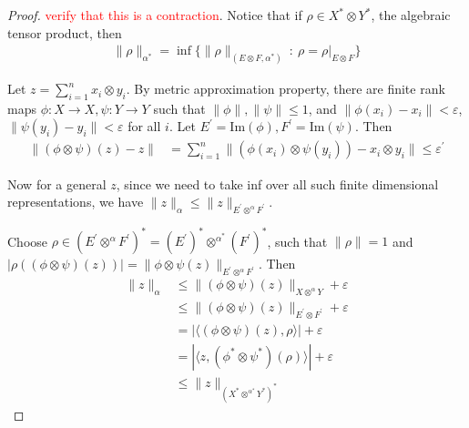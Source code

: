\begin{proof}
  \textcolor{red}{verify that this is a contraction}. Notice that if
  $\rho \in X^* \otimes Y^*$, the algebraic tensor product, then
  \begin{align*}
    \|\rho\|_{\alpha^*} = \inf \{ \|\rho\|_{(E \otimes F, \alpha^*)}
    \ : \   \rho = \rho|_{E \otimes F} \}
  \end{align*}


  Let $z = \sum_{i = 1}^{n} x_i \otimes y_i$. By metric
  approximation property, there are finite rank maps $\phi: X \to X,
  \psi: Y \to Y$ such that $\|\phi\|, \|\psi\| \le 1$, and $\|\phi(x_i)
  - x_i\| < \varepsilon$, $ \|\psi(y_i) - y_i\|< \varepsilon$ for all
  $i$. Let $E^\prime = \textrm{Im}(\phi), F^\prime = \textrm{Im}(\psi)$. Then
  \begin{align*}
    \|(\phi \otimes \psi)(z) - z\| &= \sum_{i = 1}^{n}\|(\phi(x_i)
    \otimes \psi(y_i)) -  x_i \otimes y_i\| \le \varepsilon^\prime
  \end{align*}

  Now for a general $z$, since we need to take inf over all such
  finite dimensional representations, we have $\|z\|_\alpha \le
  \|z\|_{E^\prime \otimes^{\alpha} F^\prime}$.

  Choose $\rho \in (E^\prime \otimes^\alpha F^\prime)^* =
  (E^\prime)^* \otimes^{\alpha^*} (F^\prime)^*$, such that $\|\rho\|
  = 1$ and $|\rho((\phi \otimes \psi)(z))| = \| \phi \otimes \psi
  (z)\|_{ E^\prime \otimes^\alpha F^\prime}$. Then
  \begin{align*}
    \|z\|_\alpha &\le \|(\phi \otimes \psi)(z)\|_{X \otimes^\alpha Y}
    + \varepsilon \\
    &\le \|(\phi \otimes \psi)(z)\|_{ E^\prime \otimes F^\prime} +
    \varepsilon \\
    &= |\langle (\phi \otimes \psi)(z), \rho \rangle| + \varepsilon \\
    &= |\langle z, (\phi^* \otimes \psi^*)(\rho) \rangle | + \varepsilon \\
    &\le \| z\|_{(X^* \otimes^{\alpha^*} Y^*)^*}
  \end{align*}
\end{proof}
